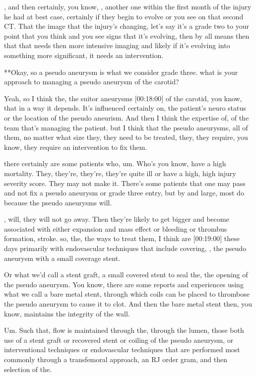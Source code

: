 \documentclass[
]{book}
\begin{document}
, and then certainly, you know, , another one within the first month of
the injury he had at best case, certainly if they begin to evolve or you
see on that second CT. That the image that the injury's changing, let's
say it's a grade two to your point that you think and you see signs that
it's evolving, then by all means then that that needs then more
intensive imaging and likely if it's evolving into something more
significant, it needs an intervention.

**Okay, so a pseudo aneurysm is
what we consider grade three. what is your approach to managing a pseudo
aneurysm of the carotid?

Yeah, so I
think the, the suitor aneurysms {[}00:18:00{]} of the carotid, you know,
that in a way it depends. It's influenced certainly on, the
patient's neuro status or the location of the pseudo aneurism. And then
I think the expertise of, of the team that's managing the patient.
but I think that the pseudo aneurysms, all of them, no matter what
size they, they need to be treated, they, they require, you know,
they require an intervention to fix them.

there certainly are some patients who, um. Who's you know, have a
high mortality. They, they're, they're, they're quite ill or have a
high, high injury severity score. They may not make it. There's some
patients that one may pass and not fix a pseudo aneurysm or grade three
entry, but by and large, most do because the pseudo aneurysms will.

, will, they will not go away. Then they're likely to get bigger and
become associated with either expansion and mass effect or bleeding or
thrombus formation, stroke. so, the, the ways to treat them, I
think are {[}00:19:00{]} these days primarily with endovascular techniques
that include covering, , the pseudo aneurysm with a small coverage
stent.

Or what we'd call a stent graft, a small covered stent to seal the, the
opening of the pseudo aneurysm. You know, there are some reports and
experiences using what we call a bare metal stent, through which
coils can be placed to thrombose the pseudo aneurysm to cause it to
clot. And then the bare metal stent then, you know, maintains the
integrity of the wall.

Um. Such that, flow is maintained through the, through the lumen, those
both use of a stent graft or recovered stent or coiling of the pseudo
aneurysm, or interventional techniques or endovascular techniques that
are performed most commonly through a transfemoral approach, an RJ order
gram, and then selection of the.
\end{document}
